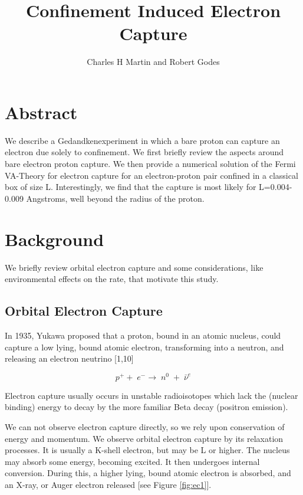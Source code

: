 \documentclass[11pt]{amsart}
\title{Confinement Induced Electron Capture}
\author{Charles H Martin and Robert Godes}
\begin{document}
\maketitle
\section{Abstract}

We describe a Gedandkenexperiment in which a bare proton can capture an electron due solely to confinement. We first briefly review the aspects around bare electron proton capture.  We then provide a numerical solution of the Fermi VA-Theory for electron capture for an electron-proton pair confined in a classical box of size L. Interestingly, we find that the capture is most likely for L=0.004-0.009 Angstroms, well beyond the radius of the proton. 

\section{Background}


We briefly review orbital electron capture and some considerations, like environmental effects on the rate, that motivate this study.

\subsection{Orbital Electron Capture}
In 1935, Yukawa proposed that a proton, bound in an atomic nucleus,  could capture a low lying, bound atomic electron, transforming into a neutron, and releasing an electron neutrino [1,10]


$$p^{+}+\;e^{-}\rightarrow\;n^{0}\;+\;\bar{\nu}^{e}$$

Electron capture usually occurs in unstable radioisotopes which lack the (nuclear binding) energy to decay by the more familiar Beta decay (positron emission).

We can not observe electron capture directly, so we rely upon conservation of energy and momentum. We observe orbital electron capture by its relaxation processes.  It is usually a K-shell electron, but may be L or higher.  The nucleus may absorb some energy, becoming excited.  It then undergoes internal conversion.  During this, a higher lying, bound atomic electron is absorbed, and an X-ray, or Auger electron released [see Figure \ref{fig:ec1}].
\end{document}
